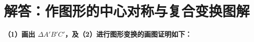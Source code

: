 \newpage



\newpage

\section{解答：作图形的中心对称与复合变换图解}

\vspace{0.6cm}

\textbf{（1）画出 $\Delta A'B'C'$，及（2）进行图形变换的画图证明如下：}

\vspace{0.4cm}

